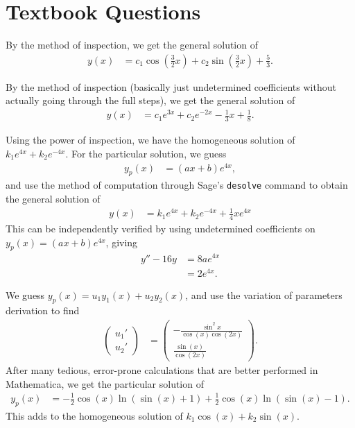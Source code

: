 \documentclass[12pt]{mypackage}
\begin{document}
\renewcommand{\arraystretch}{1.5}
\RaggedRight
\section{Textbook Questions}%
\begin{solution}[4.4, Problem 2]
  By the method of inspection, we get the general solution of
  \begin{align*}
    y(x) &= c_1\cos\left( \frac{3}{2}x \right) + c_2\sin\left( \frac{3}{2}x \right) + \frac{5}{3}.
  \end{align*}
\end{solution}
\begin{solution}[4.4, Problem 4]
  By the method of inspection (basically just undetermined coefficients without actually going through the full steps), we get the general solution of
  \begin{align*}
    y(x) &= c_1e^{3x} + c_2 e^{-2x} - \frac{1}{3}x + \frac{1}{8}.
  \end{align*}
\end{solution}
\begin{solution}[4.4, Problem 12]
  Using the power of inspection, we have the homogeneous solution of $k_1e^{4x} + k_2e^{-4x}$. For the particular solution, we guess 
  \begin{align*}
    y_p(x) &= \left( ax + b \right)e^{4x},
  \end{align*}
  and use the method of computation through Sage's \texttt{desolve} command to obtain the general solution of
  \begin{align*}
    y(x) &= k_1e^{4x} + k_2e^{-4x} + \frac{1}{4}xe^{4x}
  \end{align*}
  This can be independently verified by using undetermined coefficients on $y_p(x) = \left( ax + b \right)e^{4x}$, giving
  \begin{align*}
    y''-16y &= 8ae^{4x}\\
            &= 2e^{4x}.
  \end{align*}
\end{solution}
\begin{solution}[4.6, Problem 2]
  We guess $y_p(x) = u_1y_1(x) + u_2y_2(x)$, and use the variation of parameters derivation to find
  \begin{align*}
    \begin{pmatrix}u_1' \\ u_2'\end{pmatrix} &= \begin{pmatrix} - \frac{\sin^2 x}{\cos(x)\cos(2x)} \\ \frac{\sin(x)}{\cos\left( 2x \right)}\end{pmatrix}.
  \end{align*}
  After many tedious, error-prone calculations that are better performed in Mathematica, we get the particular solution of
  \begin{align*}
    y_p(x) &= -\frac{1}{2}\cos\left( x \right)\ln\left( \sin\left( x \right)  + 1\right) + \frac{1}{2}\cos(x)\ln\left( \sin(x) - 1 \right).
  \end{align*}
  This adds to the homogeneous solution of $k_1\cos(x) + k_2\sin(x)$.
\end{solution}
\end{document}
